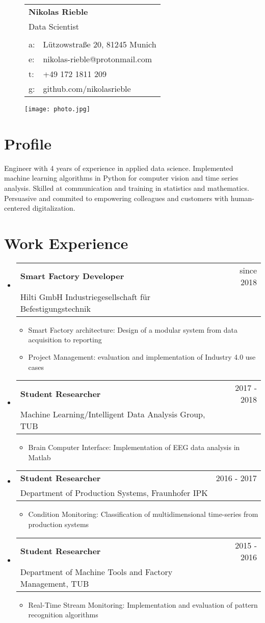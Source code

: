 \documentclass[letterpaper,11pt]{article}
\makeatletter
\newcommand{\resumeSubItem}[2]{
  \item\small{
    {#1}{:#2 \vspace{-2pt}}
  }
}
\newcommand{\resumeItem}[3]{
	\item
	\begin{tabular*}{0.97\textwidth}{l@{\extracolsep{\fill}}r}
		\textbf{#1} & #2 \\ 
		#3& \vspace{-5pt}
	\end{tabular*}}
\newcommand{\resumeSubHeadingListStart}{\begin{itemize}[leftmargin=*]}
\newcommand{\resumeSubHeadingListEnd}{\end{itemize}}
\newcommand{\resumeItemListStart}{\begin{itemize}}
\newcommand{\resumeItemListEnd}{\end{itemize}\vspace{-5pt}}
\makeatother
\begin{document}
\addtolength{\tabcolsep}{4pt}    %
{\renewcommand{\arraystretch}{1} %
\begin{figure}[t]
	\centering	
	\begin{minipage}{0.54\textwidth}	
		\begin{tabular*}{\textwidth}{ll}			
			\multicolumn{2}{l}{\textbf{{\Huge Nikolas Rieble}}}	\\	
			\multicolumn{2}{l}{Data Scientist}	\\\\ 	
			 a: &Lützowstraße 20, 81245 Munich\\
			 e: &nikolas-rieble@protonmail.com\\
			 t: &+49 172 1811 209\\	
			 g: &github.com/nikolasrieble		
		 \end{tabular*}	
	\end{minipage}	
	\begin{minipage}{0.45\textwidth}
		\centering
		\texttt{[image: photo.jpg]}
	\end{minipage}
\end{figure}
}

\section{Profile}
Engineer with 4 years of experience in applied data science. Implemented machine learning algorithms in Python for computer vision and time series analysis.   Skilled at communication and training in statistics and mathematics. Persuasive and commited to empowering colleagues and customers with human-centered digitalization.
\section{Work Experience}
  \resumeSubHeadingListStart
   	  \resumeItem{Smart Factory Developer}{since 2018}{Hilti GmbH Industriegesellschaft für Befestigungstechnik}
	 \resumeItemListStart
	 \resumeSubItem{Smart Factory architecture}
	 { Design of a modular system from data acquisition to reporting\\}
  	 \resumeSubItem{Project Management}{ evaluation and implementation of Industry 4.0 use cases}     
	 \resumeItemListEnd   
    \resumeItem{Student Researcher}{2017 - 2018}{Machine Learning/Intelligent Data Analysis Group, TUB}
    \resumeItemListStart
      \resumeSubItem{Brain Computer Interface}
      { Implementation of EEG data analysis in Matlab}
      \resumeItemListEnd      
    \resumeItem{Student Researcher}{2016 - 2017}{Department of Production Systems, Fraunhofer IPK}      
      \resumeItemListStart  
	     \resumeSubItem{Condition Monitoring}
		   { Classification of multidimensional time-series from production systems}
      \resumeItemListEnd      
    \resumeItem{Student Researcher}{2015 - 2016}{Department of Machine Tools and Factory Management, TUB}
      \resumeItemListStart
        \resumeSubItem{Real-Time Stream Monitoring}
          { Implementation and evaluation of pattern recognition algorithms}
      \resumeItemListEnd
 \resumeSubHeadingListEnd
\end{document}
